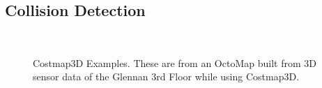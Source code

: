 \subsection{Collision Detection}\label{subsec:trajectory_generation_costmap3d}

\begin{figure}
\centering
{}
\\
\caption[costmap3d Examples]{Costmap3D Examples. These are from an OctoMap built from 3D sensor data of the Glennan 3rd Floor while using Costmap3D.}
\label{fig:costmap3d_examples}
\end{figure}

